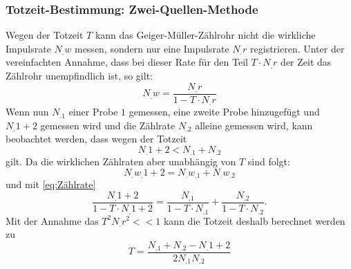 \subsubsection{Totzeit-Bestimmung: Zwei-Quellen-Methode}
Wegen der Totzeit $T$ kann das Geiger-Müller-Zählrohr nicht die wirkliche Impulsrate $N_.w$ messen, sondern nur eine Impulsrate $N_.r$ registrieren. Unter der vereinfachten Annahme, dass bei dieser Rate für den Teil $T\cdot N_.r$ der Zeit das Zählrohr unempfindlich ist, so gilt:
\begin{equation}
N_.w=\frac{N_.r}{1-T\cdot N_.r}\label{eq:Zählrate}
\end{equation}
Wenn nun $N_.1$ einer Probe $1$ gemessen, eine zweite Probe hinzugefügt und $N_.{1+2}$ gemessen wird und die Zählrate $N_.2$ alleine gemessen wird, kann beobachtet werden, dass wegen der Totzeit 
\[
N_.{1+2} < N_.1 + N_.2
\]
gilt.
Da die wirklichen Zählraten aber unabhängig von $T$ sind folgt:
\[
N_.{w_.{1+2}} = N_.{w_.1} + N_.{w_.2}
\]
und mit \eqref{eq:Zählrate}
\[
\frac{N_.{1+2}}{1-T\cdot N_.{1+2}}=\frac{N_.1}{1-T\cdot N_.1}+\frac{N_.2}{1-T\cdot N_.2} \text{.}
\]
Mit der Annahme das $T^2N_.r^2<<1$ kann die Totzeit deshalb berechnet werden zu 
\begin{equation}
T=\frac{N_.1+N_.2-N_.{1+2}}{2N_.1N_.2}\label{eq:T}
\end{equation}
